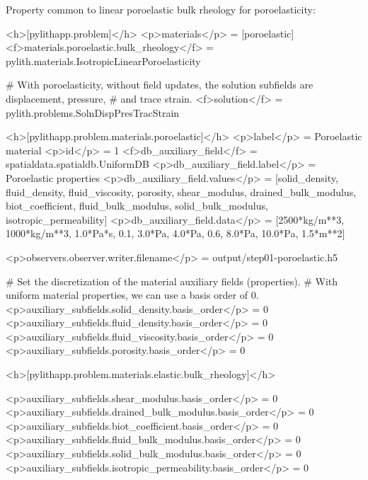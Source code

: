 Property common to linear poroelastic bulk rheology for poroelasticity:
\begin{inventory}
\end{inventory}

\begin{cfg}
  <h>[pylithapp.problem]</h>
  <p>materials</p> = [poroelastic]
  <f>materials.poroelastic.bulk_rheology</f> = pylith.materials.IsotropicLinearPoroelasticity

  # With poroelasticity, without field updates, the solution subfields are displacement, pressure,
  # and trace strain.
  <f>solution</f> = pylith.problems.SolnDispPresTracStrain

    <h>[pylithapp.problem.materials.poroelastic]</h>
  <p>label</p> = Poroelastic material
  <p>id</p> = 1
  <f>db_auxiliary_field</f> = spatialdata.spatialdb.UniformDB
  <p>db_auxiliary_field.label</p> = Poroelastic properties
  <p>db_auxiliary_field.values</p> = [solid_density, fluid_density, fluid_viscosity, porosity, shear_modulus,
  drained_bulk_modulus, biot_coefficient, fluid_bulk_modulus, solid_bulk_modulus, isotropic_permeability]
  <p>db_auxiliary_field.data</p> = [2500*kg/m**3, 1000*kg/m**3, 1.0*Pa*s, 0.1, 3.0*Pa, 4.0*Pa, 0.6,
  8.0*Pa, 10.0*Pa, 1.5*m**2]

  <p>observers.observer.writer.filename</p> = output/step01-poroelastic.h5

  # Set the discretization of the material auxiliary fields (properties).
  # With uniform material properties, we can use a basis order of 0.
  <p>auxiliary_subfields.solid_density.basis_order</p> = 0
  <p>auxiliary_subfields.fluid_density.basis_order</p> = 0
  <p>auxiliary_subfields.fluid_viscosity.basis_order</p> = 0
  <p>auxiliary_subfields.porosity.basis_order</p> = 0

    <h>[pylithapp.problem.materials.elastic.bulk_rheology]</h>

  <p>auxiliary_subfields.shear_modulus.basis_order</p> = 0
  <p>auxiliary_subfields.drained_bulk_modulus.basis_order</p> = 0
  <p>auxiliary_subfields.biot_coefficient.basis_order</p> = 0
  <p>auxiliary_subfields.fluid_bulk_modulus.basis_order</p> = 0
  <p>auxiliary_subfields.solid_bulk_modulus.basis_order</p> = 0
  <p>auxiliary_subfields.isotropic_permeability.basis_order</p> = 0
\end{cfg}


